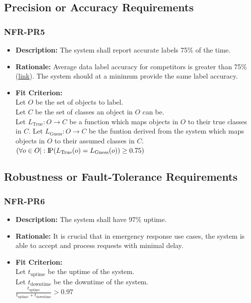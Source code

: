 \documentclass[12pt]{article}
\newcommand{\probP}{\text{I\kern-0.15em P}}
\begin{document}
\subsection{Precision or Accuracy Requirements}
\subsubsection*{NFR-PR5}
\begin{itemize}
  \item \textbf{Description:} The system shall report accurate labels 75\% of the time.
  \item \textbf{Rationale:} Average data label accuracy for competitors is greater than 75\% (\href{https://www.researchgate.net/publication/234774537_Data_quality_from_crowdsourcing_A_study_of_annotation_selection_criteria#:~:text=Depending%20on%20the%20number%20of,%5B13%5D%20%5B14%5D%20.}{link}). The system should at a minimum provide the same label accuracy.
  \item \textbf{Fit Criterion:}\\ Let $O$ be the set of objects to label.\\
  Let $C$ be the set of classes an object in $O$ can be.\\
  Let $L_{\text{True}}: O \rightarrow C $ be a function which maps objects in $O$ to their true classes in $C$.
  Let $L_{\text{Guess}}: O \rightarrow C $ be the funtion derived from the system which maps objects in $O$ to their assumed classes in $C$.
  $(\forall o \in O|: \probP(L_{\text{True}}(o) = L_{\text{Guess}}(o))\geq 0.75)$
\end{itemize}
\subsection{Robustness or Fault-Tolerance Requirements}
\subsubsection*{NFR-PR6}
\begin{itemize}
  \item \textbf{Description:} The system shall have 97\% uptime. 
  \item \textbf{Rationale:} It is crucial that in emergency response use cases, the system is able to accept and process requests with minimal delay.
  \item \textbf{Fit Criterion:}\\ Let $t_{\text{uptime}}$ be the uptime of the system.\\
  Let $t_{\text{downtime}}$ be the downtime of the system.\\
  $\frac{t_{\text{uptime}}}{t_{\text{uptime}} + t_{\text{downtime}}} > 0.97$
\end{itemize}
\end{document}
